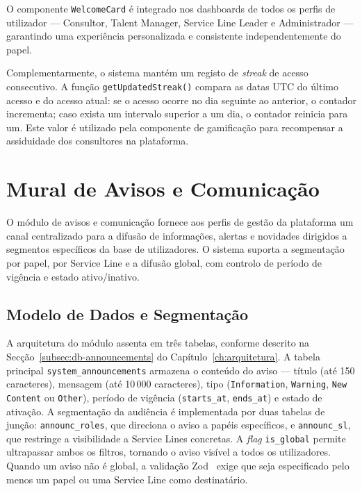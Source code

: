 \documentclass[12pt,a4paper]{report}
\begin{document}
O componente \texttt{WelcomeCard} é integrado nos dashboards de todos os perfis de utilizador --- Consultor, Talent Manager, Service Line Leader e Administrador --- garantindo uma experiência personalizada e consistente independentemente do papel.

Complementarmente, o sistema mantém um registo de \textit{streak} de acesso consecutivo. A função \texttt{getUpdatedStreak()} compara as datas UTC do último acesso e do acesso atual: se o acesso ocorre no dia seguinte ao anterior, o contador incrementa; caso exista um intervalo superior a um dia, o contador reinicia para um. Este valor é utilizado pela componente de gamificação para recompensar a assiduidade dos consultores na plataforma.

\section{Mural de Avisos e Comunicação}

O módulo de avisos e comunicação fornece aos perfis de gestão da plataforma um canal centralizado para a difusão de informações, alertas e novidades dirigidos a segmentos específicos da base de utilizadores. O sistema suporta a segmentação por papel, por Service Line e a difusão global, com controlo de período de vigência e estado ativo/inativo.

\subsection{Modelo de Dados e Segmentação}

A arquitetura do módulo assenta em três tabelas, conforme descrito na Secção~\ref{subsec:db-announcements} do Capítulo~\ref{ch:arquitetura}. A tabela principal \texttt{system\_announcements} armazena o conteúdo do aviso --- título (até 150 caracteres), mensagem (até 10\,000 caracteres), tipo (\texttt{Information}, \texttt{Warning}, \texttt{New Content} ou \texttt{Other}), período de vigência (\texttt{starts\_at}, \texttt{ends\_at}) e estado de ativação. A segmentação da audiência é implementada por duas tabelas de junção: \texttt{announc\_roles}, que direciona o aviso a papéis específicos, e \texttt{announc\_sl}, que restringe a visibilidade a Service Lines concretas. A \textit{flag} \texttt{is\_global} permite ultrapassar ambos os filtros, tornando o aviso visível a todos os utilizadores. Quando um aviso não é global, a validação Zod~\cite{zod} exige que seja especificado pelo menos um papel ou uma Service Line como destinatário.
\end{document}
